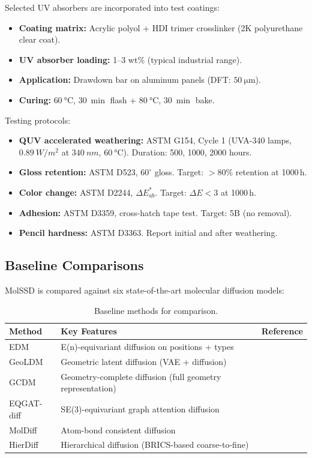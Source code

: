 \documentclass[12pt,a4paper]{article}
\begin{document}
Selected UV absorbers are incorporated into test coatings:
\begin{itemize}
    \item \textbf{Coating matrix:} Acrylic polyol + HDI trimer crosslinker (2K polyurethane clear coat).
    \item \textbf{UV absorber loading:} 1--3 wt\% (typical industrial range).
    \item \textbf{Application:} Drawdown bar on aluminum panels (DFT: $\SI{50}{\micro\meter}$).
    \item \textbf{Curing:} $\SI{60}{\celsius}$, $\SI{30}{\min}$ flash + $\SI{80}{\celsius}$, $\SI{30}{\min}$ bake.
\end{itemize}

Testing protocols:
\begin{itemize}
    \item \textbf{QUV accelerated weathering:} ASTM G154, Cycle 1 (UVA-340 lamps, $\SI{0.89}{W/m^2}$ at $\SI{340}{nm}$, $\SI{60}{\celsius}$). Duration: 500, 1000, 2000 hours.
    \item \textbf{Gloss retention:} ASTM D523, $60^\circ$ gloss. Target: $> 80\%$ retention at 1000\,h.
    \item \textbf{Color change:} ASTM D2244, $\Delta E^*_{ab}$. Target: $\Delta E < 3$ at 1000\,h.
    \item \textbf{Adhesion:} ASTM D3359, cross-hatch tape test. Target: 5B (no removal).
    \item \textbf{Pencil hardness:} ASTM D3363. Report initial and after weathering.
\end{itemize}

\subsection{Baseline Comparisons}\label{sec:baselines}

MolSSD is compared against six state-of-the-art molecular diffusion models:

\begin{table}[H]
\centering
\caption{Baseline methods for comparison.}
\label{tab:baselines}
\begin{tabular}{lp{7cm}c}
\toprule
\textbf{Method} & \textbf{Key Features} & \textbf{Reference} \\
\midrule
EDM & E(n)-equivariant diffusion on positions + types & \cite{hoogeboom2022edm} \\
GeoLDM & Geometric latent diffusion (VAE + diffusion) & \cite{xu2023geoldm} \\
GCDM & Geometry-complete diffusion (full geometry representation) & \cite{morehead2024gcdm} \\
EQGAT-diff & SE(3)-equivariant graph attention diffusion & \cite{le2024eqgat} \\
MolDiff & Atom-bond consistent diffusion & \cite{peng2023moldiff} \\
HierDiff & Hierarchical diffusion (BRICS-based coarse-to-fine) & \cite{qiang2023hierdiff} \\
\bottomrule
\end{tabular}
\end{table}
\end{document}
